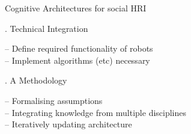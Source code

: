 \documentclass[compress]{beamer}
\begin{document}
{{\begin{frame}{Cognitive Architectures for social HRI}
\begin{multicols}{2}
    {. Technical Integration}

    {\scriptsize -- Define required functionality of robots \\-- Implement algorithms (etc) necessary}

    {. A Methodology}

    {\scriptsize -- Formalising assumptions \\-- Integrating knowledge from multiple disciplines \\-- Iteratively updating architecture}


    \end{multicols}
\end{frame}
}


%
}
\end{document}
